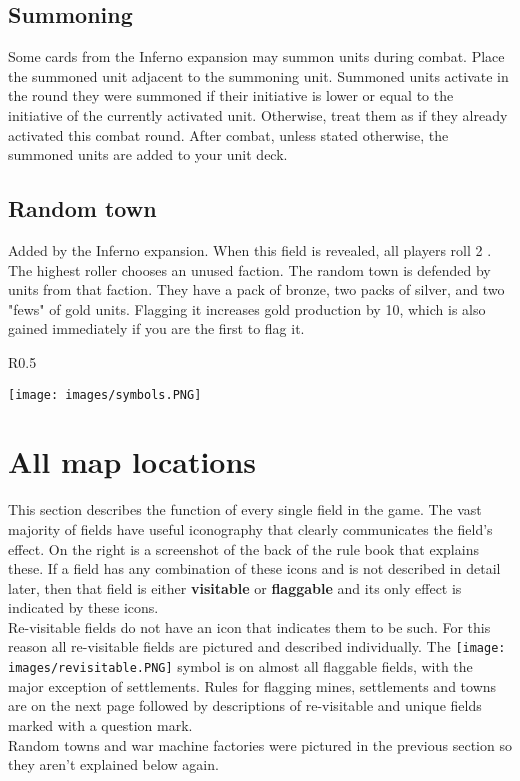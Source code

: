 \documentclass[12pt]{article}
\begin{document}
\subsection*{Summoning}
Some cards from the Inferno expansion may summon units during combat. Place the summoned unit adjacent to the summoning unit. Summoned units activate in the round they were summoned if their initiative is lower or equal to the initiative of the currently activated unit. Otherwise, treat them as if they already activated this combat round. After combat, unless stated otherwise, the summoned units are added to your unit deck.
\subsection*{Random town}
Added by the Inferno expansion. When this field is revealed, all players roll 2 . The highest roller chooses an unused faction. The random town is defended by units from that faction. They have a pack of bronze, two packs of silver, and two "fews" of gold units. Flagging it increases gold production by 10, which is also gained immediately if you are the first to flag it.
\clearpage
\begin{wrapfigure}{R}{0.5\textwidth}
    \begin{center}
    \texttt{[image: images/symbols.PNG]}
    \end{center}
\end{wrapfigure}
\section[All map locations]{All map locations\hypertarget{All}{}}

This section describes the function of every single field in the game. The vast majority of fields have useful iconography that clearly communicates the field's effect. On the right is a screenshot of the back of the rule book that explains these. If a field has any combination of these icons and is not described in detail later, then that field is either \textbf{visitable} or \textbf{flaggable} and its only effect is indicated by these icons.\\[6pt]
Re-visitable fields do not have an icon that indicates them to be such. For this reason all re-visitable fields are pictured and described individually. The \texttt{[image: images/revisitable.PNG]} symbol is on almost all flaggable fields, with the major exception of settlements. Rules for flagging mines, settlements and towns are on the next page followed by descriptions of re-visitable and unique fields marked with a question mark.\\[6pt]
Random towns and war machine factories were pictured in the previous section so they aren't explained below again.
\end{document}
